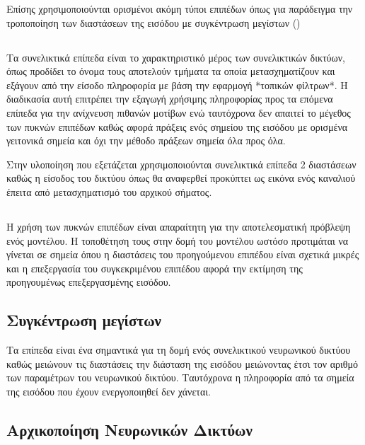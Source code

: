 Επίσης χρησιμοποιούνται ορισμένοι ακόμη τύποι επιπέδων όπως για παράδειγμα την τροποποίηση των διαστάσεων της εισόδου με συγκέντρωση μεγίστων ()

\subsection{}
Τα συνελικτικά επίπεδα είναι το χαρακτηριστικό μέρος των συνελικτικών δικτύων, όπως προδίδει το όνομα τους αποτελούν τμήματα τα οποία μετασχηματίζουν και εξάγουν από την είσοδο πληροφορία με βάση την εφαρμογή *τοπικών φίλτρων*. Η διαδικασία αυτή επιτρέπει την εξαγωγή χρήσιμης πληροφορίας προς τα επόμενα επίπεδα για την ανίχνευση πιθανών μοτίβων ενώ ταυτόχρονα δεν απαιτεί το μέγεθος των πυκνών  επιπέδων καθώς αφορά πράξεις ενός σημείου της εισόδου με ορισμένα γειτονικά σημεία και όχι την μέθοδο πράξεων σημεία όλα προς όλα.

Στην υλοποίηση που εξετάζεται χρησιμοποιούνται συνελικτικά επίπεδα 2 διαστάσεων καθώς η είσοδος του δικτύου όπως θα αναφερθεί προκύπτει ως εικόνα ενός καναλιού έπειτα από μετασχηματισμό του αρχικού σήματος.

\subsection{}
Η χρήση των πυκνών επιπέδων είναι απαραίτητη για την αποτελεσματική πρόβλεψη ενός μοντέλου. Η τοποθέτηση τους στην δομή του μοντέλου ωστόσο προτιμάται να γίνεται σε σημεία όπου η διαστάσεις του προηγούμενου επιπέδου είναι σχετικά μικρές και η επεξεργασία του συγκεκριμένου επιπέδου αφορά την εκτίμηση της προηγουμένως επεξεργασμένης εισόδου.

\subsection{Συγκέντρωση μεγίστων }
Τα επίπεδα  είναι ένα σημαντικά για τη δομή ενός συνελικτικού νευρωνικού δικτύου καθώς μειώνουν τις διαστάσεις την διάσταση της εισόδου μειώνοντας έτσι τον αριθμό των παραμέτρων του νευρωνικού δικτύου. Ταυτόχρονα η πληροφορία από τα σημεία της εισόδου που έχουν ενεργοποιηθεί δεν χάνεται. 

\subsection{Αρχικοποίηση Νευρωνικών Δικτύων}

